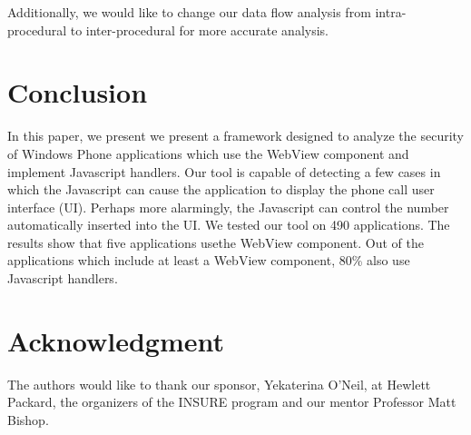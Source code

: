 \documentclass[conference]{IEEEtran}
\begin{document}
Additionally, we would like to change our data flow analysis from intra-procedural to inter-procedural for more accurate analysis.

\section{Conclusion}
In this paper, we present we present a framework designed to analyze the security of Windows Phone applications which use the WebView component and implement Javascript handlers. Our tool is capable of detecting a few cases in which the Javascript can cause the application to display the phone call user interface (UI). Perhaps more alarmingly, the Javascript can control the number automatically inserted into the UI. We tested our tool on 490 applications. The results show that five applications usethe WebView component. Out of the applications which include at least a WebView component, 80\% also use Javascript handlers.

\section*{Acknowledgment}
The authors would like to thank our sponsor, Yekaterina O'Neil, at Hewlett Packard, the organizers of the INSURE program and our mentor Professor Matt Bishop.



\end{document}
